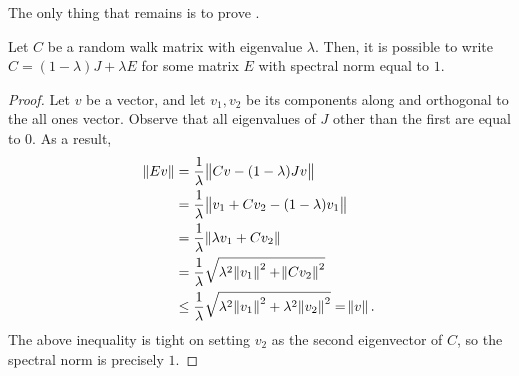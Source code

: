 			The only thing that remains is to prove .

			\begin{lemma}
				\label{lem: error of walk from complete}
				Let $C$ be a random walk matrix with eigenvalue $\lambda$. Then, it is possible to write $C = (1-\lambda)J + \lambda E$ for some matrix $E$ with spectral norm %
				equal to $1$.
			\end{lemma}
			\begin{proof}
				Let $v$ be a vector, and let $v_1,v_2$ be its components along and orthogonal to the all ones vector. Observe that all eigenvalues of $J$ other than the first are equal to $0$. As a result,
				\begin{align*}
					\norm{Ev} &= \frac{1}{\lambda} \norm{Cv - (1-\lambda)Jv} \\
						&= \frac{1}{\lambda} \norm{v_1 + Cv_2 - (1-\lambda)v_1} \\
						&= \frac{1}{\lambda} \norm{\lambda v_1 + Cv_2} \\
						&= \frac{1}{\lambda} \sqrt{\lambda^2 \norm{v_1}^2 + \norm{Cv_2}^2} \\
						&\le  \frac{1}{\lambda} \sqrt{\lambda^2 \norm{v_1}^2 + \lambda^2 \norm{v_2}^2} = \norm{v}.
				\end{align*}
				The above inequality is tight on setting $v_2$ as the second eigenvector of $C$, so the spectral norm is precisely $1$.
			\end{proof}

